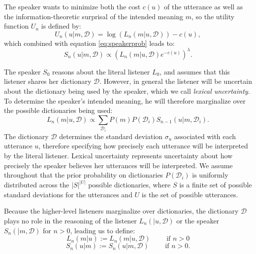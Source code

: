\documentclass{article} %
\newcommand{\dictionary}{\ensuremath{\mathcal{D}}\xspace}
\begin{document}
The speaker wants to minimize both the cost $c(u)$ of the utterance as well as the information-theoretic surprisal of the intended meaning $m$, so the utility function $U_n$ is defined by:
\begin{equation}\label{eq:speakerutility}
U_n(u | m, \dictionary) = \log (L_{n}(m | u, \dictionary)) - c(u),
\end{equation}
which combined with equation \ref{eq:speakerprob} leads to:
\begin{equation}
S_n(u | m, \dictionary) \propto (L_{n}(m | u,\dictionary)e^{-c(u)}) ^\lambda.
\end{equation}

The speaker $S_0$ reasons about the literal listener $L_0$, and assumes that this listener shares her dictionary $\dictionary$. However, in general the listener will be uncertain about the dictionary being used by the speaker, which we call \emph{lexical uncertainty}. To determine the speaker's intended meaning, he will therefore marginalize over the possible dictionaries being used:
\begin{equation}
L_n(m|u,\dictionary) \propto \sum_{\dictionary_i }P(m)P(\dictionary_i)S_{n-1}(u | m,\dictionary_i).
\end{equation}
The dictionary $\dictionary$ determines the standard deviation $\sigma_u$ associated with each utterance $u$, therefore specifying how precisely each utterance will be interpreted by the literal listener. Lexical uncertainty represents uncertainty about how precisely the speaker believes her utterances will be interpreted. We assume throughout that the prior probability on dictionaries $P(\dictionary_i)$ is uniformly distributed across the $|S|^|U|$ possible dictionaries, where $S$ is a finite set of possible standard deviations for the utterances and $U$ is the set of possible utterances. 

Because the higher-level listeners marginalize over dictionaries, the dictionary $\dictionary$ plays no role in the reasoning of the listener $L_n(|u,\dictionary)$ or the speaker $S_n(| m, \dictionary)$ for $n>0$, leading us to define:
\begin{equation}
  L_n(m | u) :=  L_n(m | u, \dictionary) \text{ ~~~~~ if $n > 0$}
\end{equation}
\begin{equation}
  S_n(u | m) :=  S_n(u | m, \dictionary) \text{ ~~~~~ if $n > 0$.}
\end{equation}
\end{document}

